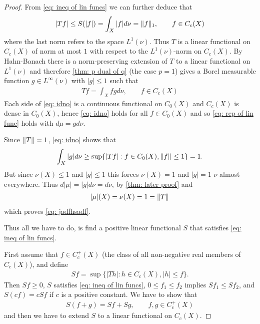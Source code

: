\documentclass[../../main.tex]{subfiles}
\begin{document}
\begin{proof}
From \eqref{eq: ineq of lin funcs} we can further deduce that
\begin{align*}
	|Tf| \le S(|f|) = \int_{X} |f| d\nu = \norm[1]{f}, \qquad f\in C_{c}(X)
\end{align*}
where the last norm refers to the space $L^{1}(\nu)$. Thus $T$ is a linear functional on $C_{c}(X)$ of norm at most $1$ with respect to the $L^{1}(\nu)$-norm on $C_{c}(X)$. By Hahn-Banach there is a norm-preserving extension of $T$ to a linear functional on $L^{1}(\nu)$ and therefore \cref{thm: p dual of q} (the case $p=1$) gives a Borel measurable function $g\in L^{\infty}(\nu)$ with $|g| \le 1$ such that
\begin{align}
	Tf=\int_{X}fgd\nu, \qquad f\in C_{c}(X) \label{eq: idno}
\end{align}
Each side of \eqref{eq: idno} is a continuous functional on $C_{0}(X)$ and $C_{c}(X)$ is dense in $C_{0}(X)$, hence \eqref{eq: idno} holds for all $f\in C_{0}(X)$ and so \eqref{eq: rep of lin func} holds with $d\mu=g d\nu$.

Since $\norm{T}=1$, \eqref{eq: idno} shows that
\begin{align*}
	\int_{X} |g| d\nu \ge \sup\{ |Tf| : f\in C_{0}(X), \norm{f} \le 1 \} = 1.
\end{align*}
But since $\nu(X) \le 1$ and $|g| \le 1$ this forces $\nu(X)=1$ and $|g|=1$ $\nu$-almost everywhere. Thus $d|\mu| = |g| d\nu = d\nu$, by \cref{thm: later proof} and
\begin{align*}
	|\mu| (X) = \nu(X) = 1 = \norm{T}
\end{align*}
which proves \eqref{eq: jadfhsadf}.

Thus all we have to do, is find a positive linear functional $S$ that satisfies \eqref{eq: ineq of lin funcs}.

First assume that $f\in C_{c}^{+}(X)$ (the class of all non-negative real members of $C_{c}(X)$), and define
\begin{align*}
	Sf=\sup\{ |Th| : h\in C_{c}(X), |h| \le f \}.
\end{align*}
Then $Sf \ge 0$, $S$ satisfies \eqref{eq: ineq of lin funcs}, $0 \le f_{1} \le f_{2}$ implies $Sf_{1} \le Sf_{2}$, and $S(cf)=cSf$ if $c$ is a positive constant. We have to show that
\begin{align}
	S(f+g)=Sf+Sg, \qquad f,g\in C_{c}^{+}(X) \label{eq: linearity}
\end{align}
and then we have to extend $S$ to a linear functional on $C_{c}(X)$.


\end{proof}
\end{document}

